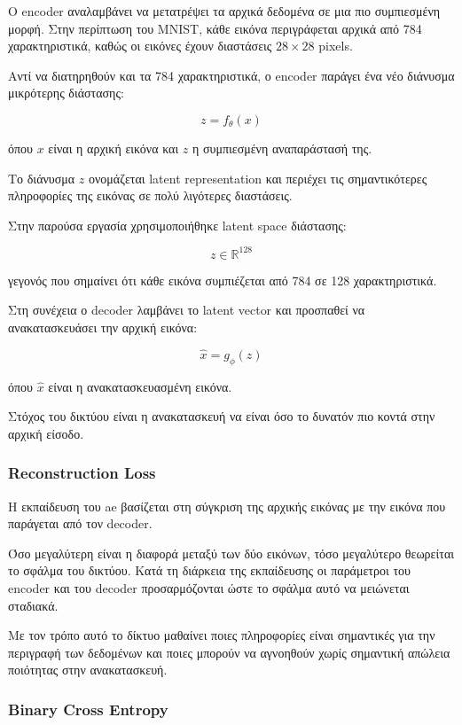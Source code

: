 \documentclass[12pt]{article}
\begin{document}
Ο encoder αναλαμβάνει να μετατρέψει τα αρχικά δεδομένα σε μια πιο συμπιεσμένη μορφή. Στην περίπτωση του MNIST, κάθε εικόνα περιγράφεται αρχικά από 
784 χαρακτηριστικά, καθώς οι εικόνες έχουν διαστάσεις \(28\times28\) pixels.

Αντί να διατηρηθούν και τα 784 χαρακτηριστικά, ο encoder παράγει ένα νέο διάνυσμα μικρότερης διάστασης:

\[
z=f_{\theta}(x)
\]

όπου \(x\) είναι η αρχική εικόνα και \(z\) η συμπιεσμένη αναπαράστασή της.

Το διάνυσμα \(z\) ονομάζεται latent representation και περιέχει τις σημαντικότερες πληροφορίες της εικόνας σε πολύ λιγότερες διαστάσεις.

Στην παρούσα εργασία χρησιμοποιήθηκε latent space διάστασης:

\[
z\in\mathbb{R}^{128}
\]

γεγονός που σημαίνει ότι κάθε εικόνα συμπιέζεται από 784 σε 128 χαρακτηριστικά.

Στη συνέχεια ο decoder λαμβάνει το latent vector και προσπαθεί να ανακατασκευάσει την αρχική εικόνα:

\[
\hat{x}=g_{\phi}(z)
\]

όπου \(\hat{x}\) είναι η ανακατασκευασμένη εικόνα.

Στόχος του δικτύου είναι η ανακατασκευή να είναι όσο το δυνατόν πιο κοντά στην αρχική είσοδο.

\subsubsection{Reconstruction Loss}

Η εκπαίδευση του ae βασίζεται στη σύγκριση της αρχικής εικόνας με την εικόνα που παράγεται από τον decoder.

Όσο μεγαλύτερη είναι η διαφορά μεταξύ των δύο εικόνων, τόσο μεγαλύτερο θεωρείται το σφάλμα του δικτύου. Κατά τη διάρκεια της εκπαίδευσης οι παράμετροι 
του encoder και του decoder προσαρμόζονται ώστε το σφάλμα αυτό να μειώνεται σταδιακά.

Με τον τρόπο αυτό το δίκτυο μαθαίνει ποιες πληροφορίες είναι σημαντικές για την περιγραφή των δεδομένων και ποιες μπορούν να αγνοηθούν χωρίς σημαντική 
απώλεια ποιότητας στην ανακατασκευή.

\subsubsection{Binary Cross Entropy}
\end{document}
